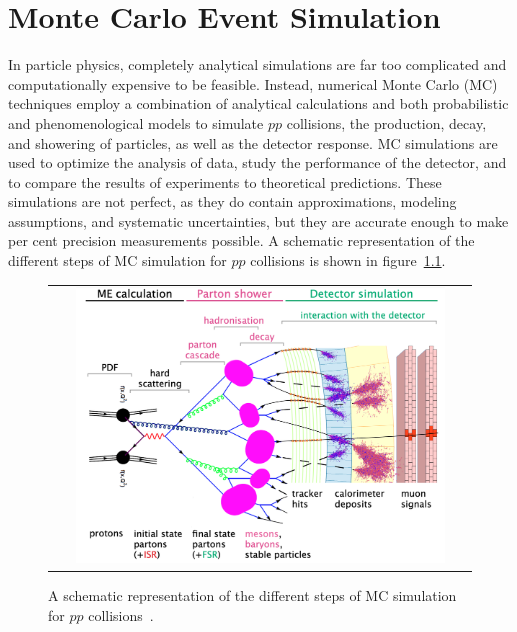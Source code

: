 
\chapter{Monte Carlo Event Simulation}
\label{Monte_Carlo_Event_Simulation}
In particle physics, completely analytical simulations are far too complicated and computationally expensive to be feasible.
Instead, numerical Monte Carlo (MC) techniques employ a combination of analytical calculations and both probabilistic and phenomenological models to simulate $pp$ collisions, the production, decay, and showering of particles, as well as the detector response.
MC simulations are used to optimize the analysis of data, study the performance of the detector, and to compare the results of experiments to theoretical predictions.
These simulations are not perfect, as they do contain approximations, modeling assumptions, and systematic uncertainties, but they are accurate enough to make per cent precision measurements possible.
A schematic representation of the different steps of MC simulation for $pp$ collisions is shown in figure~\ref{MC_simulation}.
\begin{figure}[!htb]
  \begin{center}
    \begin{tabular}{c}
        \includegraphics[width=0.9\textwidth]{fig_Event_Simulation/MC_simulation.png}
    \end{tabular}
    \caption{A schematic representation of the different steps of MC simulation for $pp$ collisions~\cite{bartosik}.
            }
    \label{MC_simulation}
  \end{center}
\end{figure}


